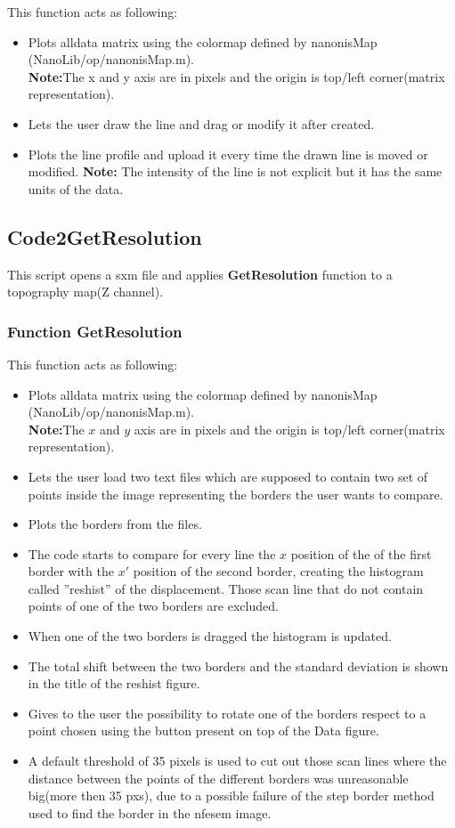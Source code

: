 This function acts as following:
\begin{itemize}  
\item Plots alldata matrix using the colormap defined by nanonisMap (NanoLib/op/nanonisMap.m).\\
\textbf{Note:}The x and y axis are in pixels and the origin is top/left corner(matrix representation).
\item Lets the user draw the line and drag or modify it after created.
\item Plots the line profile and upload it every time the drawn line is moved or modified.
\textbf{Note:} The intensity of the line is not explicit but it has the same units of the data.
\end{itemize}

\subsection{Code2GetResolution}

This script opens a sxm file and applies \textbf{GetResolution} function to a topography map(Z channel).

\subsubsection{Function GetResolution}

This function acts as following:
\begin{itemize}  
\item Plots alldata matrix using the colormap defined by nanonisMap (NanoLib/op/nanonisMap.m).\\
\textbf{Note:}The $x$ and $y$ axis are in pixels and the origin is top/left corner(matrix representation).
\item Lets the user load two text files which are supposed to contain two set of points inside the image representing the borders the user wants to compare.
\item Plots the borders from the files.
\item The code starts to compare for every line the $x$ position of the of the first border with the $x'$ position of the second border, creating the histogram called ''reshist'' of the displacement. Those scan line that do not contain points of one of the two borders are excluded.
\item When one of the two borders is dragged the histogram is updated.
\item The total shift between the two borders and the standard deviation is shown in the title of the reshist figure.
\item Gives to the user the possibility to rotate one of the borders respect to a point chosen using the button present on top of the Data figure. 
\item A default threshold of 35 pixels is used to cut out those scan lines where the distance between the points of the different borders was unreasonable big(more then 35 pxs), due to a possible failure of the step border method used to find the border in the nfesem image.
\end{itemize}

